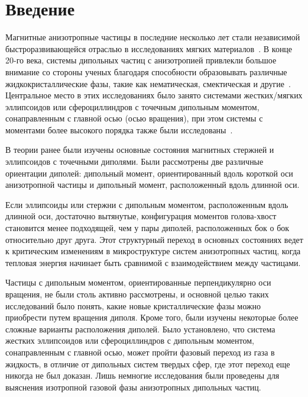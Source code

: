 \documentclass[a4paper,14pt]{extarticle}
\begin{document}
    \newpage

    \section*{Введение}

    Магнитные анизотропные частицы в последние несколько лет стали независимой быстроразвивающейся отраслью в исследованиях мягких материалов~\cite{bib:three, bib:four, bib:five, bib:six}. В конце 20-го века, системы дипольных частиц с анизотропией привлекли большое внимание со стороны ученых благодаря способности образовывать различные жидкокристаллические фазы, такие как нематическая, смектическая и другие~\cite{bib:seven, bib:eight, bib:nine, bib:ten}. Центральное место в этих исследованиях было занято системами жестких/мягких эллипсоидов или сфероциллиндров с точечным дипольным моментом, сонаправленным с главной осью (осью вращения), при этом системы с моментами более высокого порядка также были исследованы~\cite{bib:one}.

    В теории ранее были изучены основные состояния магнитных стержней и эллипсоидов с точечными диполями. Были рассмотрены две различные ориентации диполей: дипольный момент, ориентированный вдоль короткой оси анизотропной частицы и дипольный момент, расположенный вдоль длинной оси.

    Если эллипсоиды или стержни с дипольным моментом, расположенным вдоль длинной оси, достаточно вытянутые, конфигурация моментов голова-хвост становится менее подходящей, чем у пары диполей, расположенных бок о бок относительно друг друга. Этот структурный переход в основных состояниях ведет к критическим изменениям в микроструктуре систем анизотропных частиц, когда тепловая энергия начинает быть сравнимой с взаимодействием между частицами.

    Частицы с дипольным моментом, ориентированные перпендикулярно оси вращения, не были столь активно рассмотрены, и основной целью таких исследований было понять, какие новые кристаллические фазы можно приобрести путем вращения диполя. Кроме того, были изучены некоторые более сложные варианты расположения диполей. Было установлено, что система жестких эллипсоидов или сфероциллиндров с дипольным моментом, сонаправленным с главной осью, может пройти фазовый переход из
    газа в жидкость, в отличие от дипольных систем твердых сфер, где этот
    переход еще никогда не был доказан. Лишь немногие исследования были проведены для выяснения изотропной газовой фазы анизотропных дипольных частиц.
\end{document}
